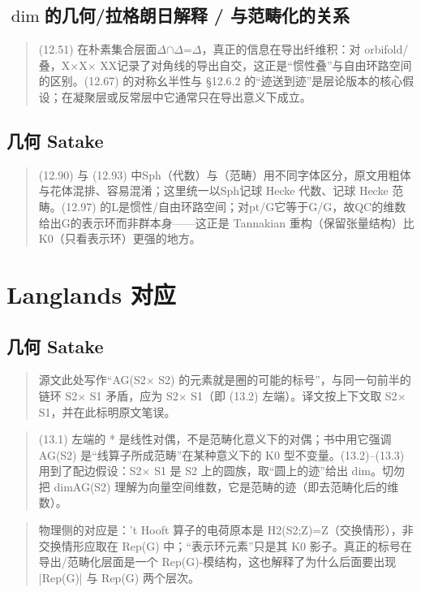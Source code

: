 \subsection*{$\dim$的几何/拉格朗日解释 / 与范畴化的关系}
\begin{quote}\small
(12.51) 在朴素集合层面$\Delta$$\cap$$\Delta$=$\Delta$，真正的信息在导出纤维积：对 orbifold/叠，X$\times$X$\times$ XX记录了对角线的导出自交，这正是“惯性叠”与自由环路空间的区别。(12.67) 的对称幺半性与 §12.6.2 的“迹送到迹”是层论版本的核心假设；在凝聚层或反常层中它通常只在导出意义下成立。
\end{quote}

\subsection*{几何 Satake}
\begin{quote}\small
(12.90) 与 (12.93) 中Sph（代数）与（范畴）用不同字体区分，原文用粗体与花体混排、容易混淆；这里统一以Sph记球 Hecke 代数、记球 Hecke 范畴。(12.97) 的L是惯性/自由环路空间；对pt/G它等于G/G，故QC的维数给出G的表示环而非群本身——这正是 Tannakian 重构（保留张量结构）比K0（只看表示环）更强的地方。
\end{quote}

\section{Langlands 对应}
\subsection*{几何 Satake}
\begin{quote}\small
源文此处写作“AG(S2$\times$ S2) 的元素就是圈的可能的标号”，与同一句前半的链环 S2$\times$ S1 矛盾，应为 S2$\times$ S1（即 (13.2) 左端）。译文按上下文取 S2$\times$ S1，并在此标明原文笔误。
\end{quote}

\begin{quote}\small
(13.1) 左端的 * 是线性对偶，不是范畴化意义下的对偶；书中用它强调 AG(S2) 是“线算子所成范畴”在某种意义下的 K0 型不变量。(13.2)--(13.3) 用到了配边假设：S2$\times$ S1 是 S2 上的圆族，取“圆上的迹”给出 dim。切勿把 dimAG(S2) 理解为向量空间维数，它是范畴的迹（即去范畴化后的维数）。
\end{quote}

\begin{quote}\small
物理侧的对应是：'t Hooft 算子的电荷原本是 H2(S2;Z)=Z（交换情形），非交换情形应取在 Rep(G) 中；“表示环元素”只是其 K0 影子。真正的标号在导出/范畴化层面是一个 Rep(G)-模结构，这也解释了为什么后面要出现 |Rep(G)| 与 Rep(G) 两个层次。
\end{quote}

